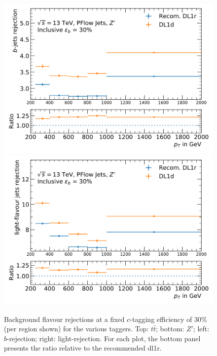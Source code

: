 \begin{center}
\begin{figure}[h!]
\centerline{
\includegraphics[scale=0.425]{Images/FTAG/DL1d/perpT/zpcb.png}
\includegraphics[scale=0.425]{Images/FTAG/DL1d/perpT/zpcu.png}
}
\caption{Background flavour rejections at a fixed $c$-tagging efficiency of 30\% (per region shown) for the various taggers. Top: $t\bar{t}$; bottom: $Z'$; left: $b$-rejection; right: light-rejection. For each plot, the bottom panel presents the ratio relative to the recommended \gls{dl1r}.}
\label{fig:ptDL1dz}
\end{figure}
\end{center}

